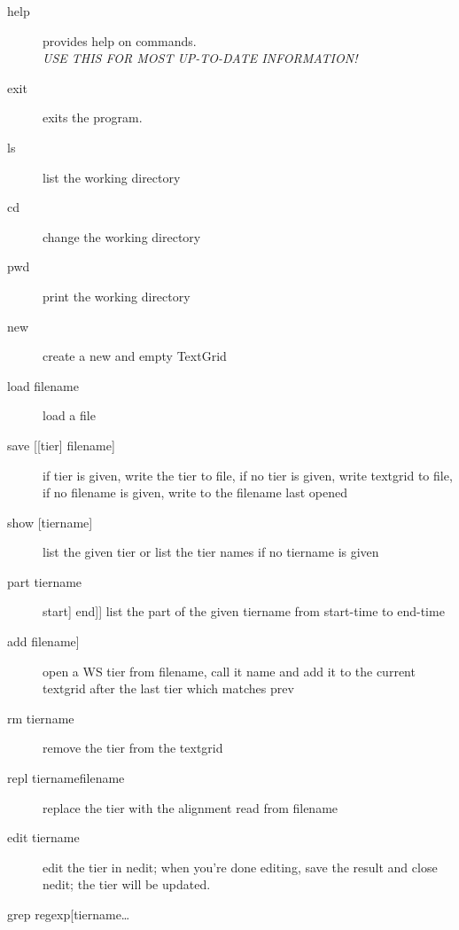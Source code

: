 \documentclass[a4,twoside=off,draft=true]{scrartcl}
\begin{document}
\begin{description}
  \item[help] provides help on commands.\\ \emph{USE THIS FOR MOST UP-TO-DATE INFORMATION!}
  \item[exit] exits the program.
  \item[] %
  \item[ls] list the working directory
  \item[cd] change the working directory
  \item[pwd] print the working directory
  \item[] %
  \item[new] create a new and empty TextGrid
  \item[load \textlangle filename\textrangle] load a file
  \item[{save [[\textlangle tier\textrangle] \textlangle filename\textrangle]}] 
        if tier is given, write the tier to file, if no tier
        is given, write textgrid to file, if no filename is given, write to the filename
        last opened
  \item[] %
  \item[{show [\textlangle tiername\textrangle]}] 
        list the given tier or list the tier names if no tiername is given
  \item[part \textlangle tiername\textrangle] \textlangle start\textrangle] \textlangle end\textrangle]]
        list the part of the given tiername from start-time to end-time
  \item[] %
  \item[{add \textlangle filename\textrangle [\textlangle name\textrangle [\textlangle prev\textrangle]]}]
        open a WS tier from filename, call it name and add it to the
        current textgrid after the last tier which matches prev
  \item[rm \textlangle tiername\textrangle] remove the tier from the textgrid
  \item[repl \textlangle tiername\textrangle \textlangle filename\textrangle]
        replace the tier with the alignment read from filename
  \item[] %
  \item[edit \textlangle tiername\textrangle] edit the tier in nedit; when you're done editing,
        save the result and close nedit; the tier will be updated.
  \item[{grep \textlangle regexp\textrangle [\textlangle tiername\textrangle \ldots}]

\end{description}
\end{document}

